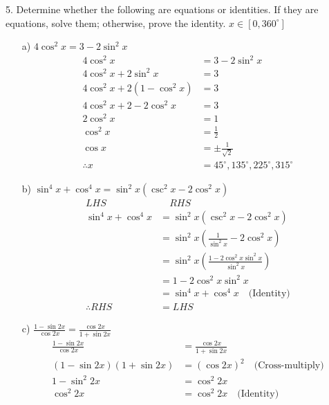 \documentclass{article}
\newenvironment{solution}{\color{solutioncolor}}{}
\begin{document}
5. Determine whether the following are equations or identities. If they are equations, solve them; otherwise, prove the identity. $x\in[0, 360^{\circ}]$
\begin{enumerate}
    \item[a)] $4\cos^2x = 3 - 2\sin^2x$
    \begin{solution}
        \begin{align*}
            4\cos^2x &= 3 - 2\sin^2x \\
            4\cos^2x + 2\sin^2x &= 3 \\
            4\cos^2x + 2(1 - \cos^2x) &= 3 \\
            4\cos^2x + 2 - 2\cos^2x &= 3 \\
            2\cos^2x &= 1 \\
            \cos^2x &= \frac{1}{2} \\
            \cos x &= \pm \frac{1}{\sqrt{2}} \\
            \therefore x &= 45^{\circ}, 135^{\circ}, 225^{\circ}, 315^{\circ}
        \end{align*}
    \end{solution}

    \item[b)] $\sin^4x + \cos^4x = \sin^2x (\csc^2x - 2\cos^2x)$
    \begin{solution}
        \begin{align*}
            LHS &\quad RHS\\
            \sin^4x + \cos^4x &= \sin^2x (\csc^2x - 2\cos^2x) \\
            &= \sin^2x \left(\frac{1}{\sin^2x} - 2\cos^2x\right) \\
            &= \sin^2x \left(\frac{1 - 2\cos^2x \sin^2x}{\sin^2x}\right) \\
            &= 1 - 2\cos^2x \sin^2x \\
            &= \sin^4x + \cos^4x \quad \text{(Identity)}\\
            \therefore RHS &= LHS
        \end{align*}
    \end{solution}

    \item[c)] $\frac{1 - \sin 2x}{\cos 2x} = \frac{\cos 2x}{1 + \sin 2x}$
    \begin{solution}
        \begin{align*}
            \frac{1 - \sin 2x}{\cos 2x} &= \frac{\cos 2x}{1 + \sin 2x} \\
            (1 - \sin 2x)(1 + \sin 2x) &= (\cos 2x)^2 \quad             \text{(Cross-multiply)} \\
            1 - \sin^2 2x &= \cos^2 2x \\
            \cos^2 2x &= \cos^2 2x \quad \text{(Identity)}
        \end{align*}
    \end{solution}


\end{enumerate}
\end{document}
